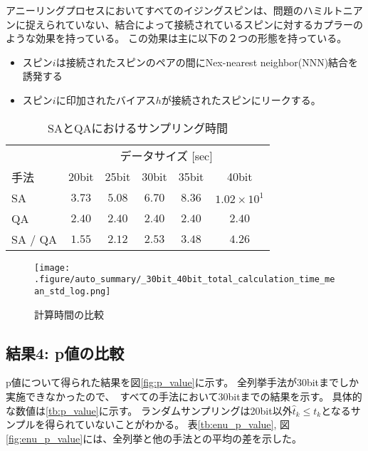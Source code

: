 アニーリングプロセスにおいてすべてのイジングスピンは、問題のハミルトニアンに捉えられていない、結合によって接続されているスピンに対するカプラーのような効果を持っている。
この効果は主に以下の２つの形態を持っている。
\begin{itemize}
	\item スピン$i$は接続されたスピンのペアの間にNex-nearest neighbor(NNN)結合を誘発する
	\item スピン$i$に印加されたバイアス$h$が接続されたスピンにリークする。
\end{itemize}




\begin{table}[hbtp]
	\caption{SAとQAにおけるサンプリング時間}
	\label{tb:sampling_time_SA_QA}
	\centering
	\begin{tabular}{lccccc}
		\hline
		& \multicolumn{5}{c}{データサイズ [sec]}\\
		手法& 20bit & 25bit & 30bit & 35bit & 40bit\\
		\hline\hline
		SA & $3.73$ & $5.08$ & $6.70$ & $8.36$ & $1.02\times 10^{1}$\\
		\hline
		QA & $2.40$ & $2.40$ & $2.40$ & $2.40$ & $2.40$\\
		\hline
		SA / QA & $1.55$ & $2.12$ & $2.53$ & $3.48$ & $4.26$\\
		\hline
	\end{tabular}
\end{table}



\begin{figure}
	\begin{center}
		\texttt{[image: .figure/auto\_summary/\_30bit\_40bit\_total\_calculation\_time\_mean\_std\_log.png]}
	\end{center}
	\caption{計算時間の比較}
	\label{fig:total_time}
\end{figure}

\subsection{結果4: p値の比較}
p値について得られた結果を図\ref{fig:p_value}に示す。
全列挙手法が30bitまでしか実施できなかったので、　すべての手法において30bitまでの結果を示す。
具体的な数値は\ref{tb:p_value}に示す。
ランダムサンプリングは20bit以外$\hat{t}_k \le t_k$となるサンプルを得られていないことがわかる。
表\ref{tb:enu_p_value}, 図\ref{fig:enu_p_value}には、全列挙と他の手法との平均の差を示した。


